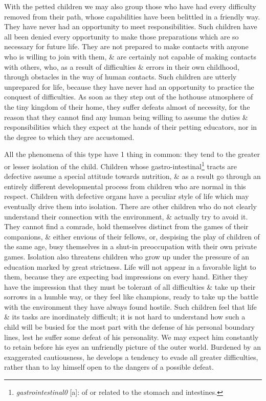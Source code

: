 \documentclass{article}
\begin{document}
With the petted children we may also group those who have had every difficulty removed from their path, whose capabilities have been belittled in a friendly way. They have never had an opportunity to meet responsibilities. Such children have all been denied every opportunity to make those preparations which are so necessary for future life. They are not prepared to make contacts with anyone who is willing to join with them, \& are certainly not capable of making contacts with others, who, as a result of difficulties \& errors in their own childhood, through obstacles in the way of human contacts. Such children are utterly unprepared for life, because they have never had an opportunity to practice the conquest of difficulties. As soon as they step out of the hothouse atmosphere of the tiny kingdom of their home, they suffer defeats almost of necessity, for the reason that they cannot find any human being willing to assume the duties \& responsibilities which they expect at the hands of their petting educators, nor in the degree to which they are accustomed.

All the phenomena of this type have 1 thing in common: they tend to the greater or lesser isolation of the child. Children whose gastro-intestinal\footnote{{\it  gastrointestinal0} [a]: of or related to the stomach and intestines.} tracts are defective assume a special attitude towards nutrition, \& as a result go through an entirely different developmental process from children who are normal in this respect. Children with defective organs have a peculiar style of life which may eventually drive them into isolation. There are other children who do not clearly understand their connection with the environment, \& actually try to avoid it. They cannot find a comrade, hold themselves distinct from the games of their companions, \& either envious of their fellows, or, despising the play of children of the same age, busy themselves in a shut-in preoccupation with their own private games. Isolation also threatens children who grow up under the pressure of an education marked by great strictness. Life will not appear in a favorable light to them, because they are expecting bad impressions on every hand. Either they have the impression that they must be tolerant of all difficulties \& take up their sorrows in a humble way, or they feel like champions, ready to take up the battle with the environment they have always found hostile. Such children feel that life \& its tasks are inordinately difficult; it is not hard to understand how such a child will be busied for the most part with the defense of his personal boundary lines, lest he suffer some defeat of his personality. We may expect him constantly to retain before his eyes an unfriendly picture of the outer world. Burdened by an exaggerated cautiousness, he develops a tendency to evade all greater difficulties, rather than to lay himself open to the dangers of a possible defeat.
\end{document}
